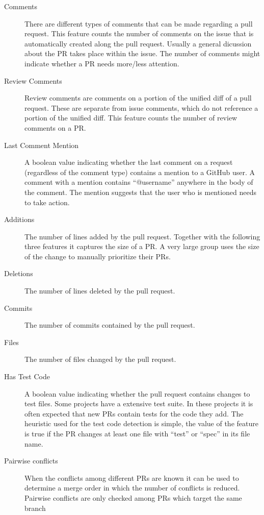 \begin{description}
\item[Comments]
There are different types of comments that can be made regarding a pull request.
This feature counts the number of comments on the issue that is automatically created along the pull request.
Usually a general dicussion about the PR takes place within the issue.
The number of comments might indicate whether a PR needs more/less attention.

\item[Review Comments]
Review comments are comments on a portion of the unified diff of a pull request.
These are separate from issue comments, which do not reference a portion of the unified diff.
This feature counts the number of review comments on a PR.

\item[Last Comment Mention]
A boolean value indicating whether the last comment on a request (regardless of the comment type) contains a mention to a GitHub user.
A comment with a mention contains ``@username'' anywhere in the body of the comment.
The mention suggests that the user who is mentioned needs to take action.

\item[Additions]
The number of lines added by the pull request.
Together with the following three features it captures the size of a PR.
A very large group uses the size of the change to manually prioritize their PRs.

\item[Deletions]
The number of lines deleted by the pull request.

\item[Commits]
The number of commits contained by the pull request.

\item[Files]
The number of files changed by the pull request.

\item[Has Test Code]
A boolean value indicating whether the pull request contains changes to test files.
Some projects have a extensive test suite.
In these projects it is often expected that new PRs contain tests for the code they add.
The heuristic used for the test code detection is simple, the value of the feature is true if the PR changes at least one file with ``test'' or ``spec'' in its file name.

\item[Pairwise conflicts]
When the conflicts among different PRs are known it can be used to determine a merge order in which the number of conflicts is reduced.
Pairwise conflicts are only checked among PRs which target the same branch
\end{description}


